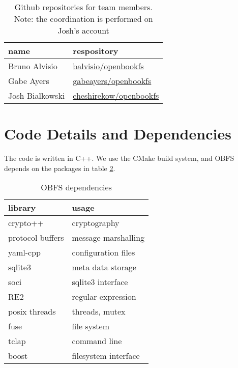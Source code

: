\documentclass[10pt,twocolumn]{article}
\begin{document}
\begin{table}
    \centering
    \begin{tabular}{l|l}
        \textbf{name}     &  \textbf{respository}    \\ \hline
        Bruno Alvisio     &  \url{balvisio/openbookfs}    \\
        Gabe  Ayers       &  \url{gabeayers/openbookfs}   \\
        Josh  Bialkowski  &  \url{cheshirekow/openbookfs} \\
    \end{tabular}
    \caption{Github repositories for team members. Note: the coordination is 
             performed on Josh's account}
    \label{tbl:github}
\end{table}


\section{Code Details and Dependencies}

The code is written in C++. We use the CMake build system, and OBFS depends on
the packages in table \ref{tbl:dependencies}.


\begin{table}[h]
    \centering
    \begin{tabular}{l|l}
      \textbf{library} & \textbf{usage} \\ \hline
      crypto++          & cryptography        \\
      protocol buffers  & message marshalling \\
      yaml-cpp          & configuration files \\
      sqlite3           & meta data storage   \\
      soci              & sqlite3 interface   \\
      RE2               & regular expression  \\
      posix threads     & threads, mutex      \\
      fuse              & file system         \\
      tclap             & command line        \\
      boost             & filesystem interface\\ 
    \end{tabular}
    \caption{OBFS dependencies}
    \label{tbl:dependencies}
\end{table}
\end{document}
